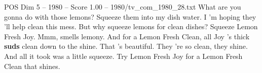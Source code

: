 \begin{textsample}{POS Dim 5 – 1980 – Score 1.00 – 1980/tv\_com\_1980\_28.txt}  \label{ex:f5_pos_011}
What are you gonna do with those lemons?
Squeeze them into my dish water.
I 'm hoping they 'll help clean this mess.
But why squeeze lemons for clean dishes?
Squeeze Lemon Fresh Joy.
Mmm, smells lemony.
And for a Lemon Fresh Clean, all Joy 's thick \textbf{suds} clean down to the shine.
That 's beautiful.
They 're so clean, they shine.
And all it took was a little squeeze.
Try Lemon Fresh Joy for a Lemon Fresh Clean that shines.

\end{textsample}

